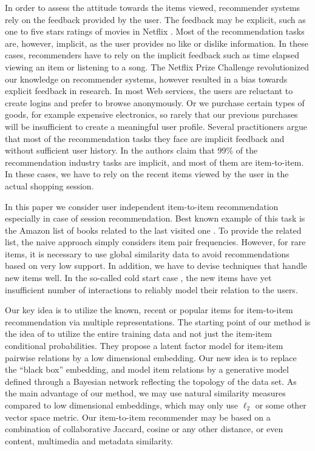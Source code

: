 \documentclass[preprint]{sig-alternate-05-2015}
\begin{document}
In order to assess the attitude towards the items viewed, recommender systems rely on the feedback provided by the user.
The feedback may be explicit, such as one to five stars ratings of movies in Netflix \cite{adhikari2012unreeling}. 
Most of the recommendation tasks are, however, implicit, as the user provides no like or dislike information.  
In these cases, recommenders have to rely on the implicit feedback such as time elapsed viewing an item or listening to a song.  
The Netflix Prize Challenge \cite{bennett2007netflix,koren2009bellkor} revolutionized our knowledge on recommender systems, however resulted in a bias towards explicit feedback in research.
In most Web services, the users are reluctant to create logins and prefer to browse anonymously.  Or we purchase certain types of goods, for example expensive electronics, so rarely that our previous purchases will be insufficient to create a meaningful user profile.
Several practitioners \cite{koenigstein2013towards} argue that most of the recommendation tasks they face are implicit feedback and without sufficient user history.
In \cite{pilaszy2015neighbor} the authors claim that 99\% of the recommendation industry tasks are implicit, and most of them are item-to-item. 
In these cases, we have to rely on the recent items viewed by the user in the actual shopping session.


In this paper we consider user independent item-to-item recommendation \cite{sarwar01item,amazon-recommender} especially in case of session recommendation. 
Best known example of this task is the Amazon list of books related to the last visited one \cite{amazon-recommender}. 
To provide the related list, the naive approach simply considers item pair frequencies.  However, for rare items, it is necessary to use global similarity data to avoid recommendations based on very low support.
In addition, we have to devise techniques that handle new items well. In the so-called cold start case \cite{schein2002methods}, the new items have yet insufficient number of interactions to reliably model their relation to the users.

Our key idea is to utilize the known, recent or popular items for item-to-item recommendation via multiple representations. The starting point of our method is the idea of \cite{koenigstein2013towards} to utilize the entire training data and not just the item-item conditional probabilities.
They propose a latent factor model for item-item pairwise relations by a low dimensional embedding.
Our new idea is to replace the ``black box''  embedding, and model item relations by a generative model defined through a Bayesian network reflecting the topology of the data set.  
As the main advantage of our method, we may use natural similarity measures compared to low dimensional embeddings, which may only use $\ell_2$ or some other vector space metric. 
Our item-to-item recommender may be based on a combination of collaborative Jaccard, cosine or any other distance, or even content, multimedia and metadata similarity.
\end{document}
